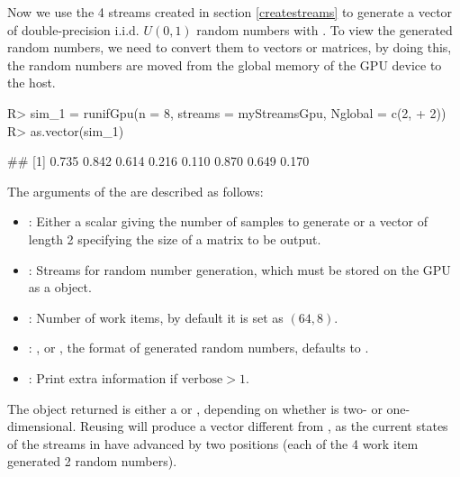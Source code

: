 \documentclass[article,nojss]{jss}\usepackage[]{graphicx}\usepackage[]{color}
\newcommand{\fct}[1]{\code{#1()}}
\begin{document}
Now we use the 4 streams created in section \ref{createstreams} to generate a vector of double-precision i.i.d. $U(0,1)$ random numbers with \fct{runifGpu}. To view the generated random numbers, we need to convert them to  vectors or matrices, by doing this, the random numbers are moved from the global memory of the GPU device to the host.
\begin{CodeChunk}
\begin{CodeInput}
R> sim_1 = runifGpu(n = 8, streams = myStreamsGpu, Nglobal = c(2,
+    2))
R> as.vector(sim_1)
\end{CodeInput}
\begin{CodeOutput}
## [1] 0.735 0.842 0.614 0.216 0.110 0.870 0.649 0.170
\end{CodeOutput} 
\end{CodeChunk} 

The arguments of the \fct{runifGpu} are described as follows:
\begin{itemize}
\itemsep0em 
  \item {}: Either a scalar giving the number of samples to generate or a vector of length 2 specifying the size of a matrix to be output.
  \item {}: Streams for random number generation, which must be stored on the GPU as a  object.
  \item {}: Number of work items, by default it is set as $(64,8)$.
  \item {}: ,  or , the format of generated random numbers, defaults to .
  \item {}: Print extra information if $\text{verbose} > 1$.
\end{itemize}

The object returned is either a  or , depending on whether  is two- or one-dimensional.  Reusing  will produce a vector different from , as the current states of the streams in  have advanced by two positions (each of the 4 work item generated 2 random numbers).  
\end{document}
